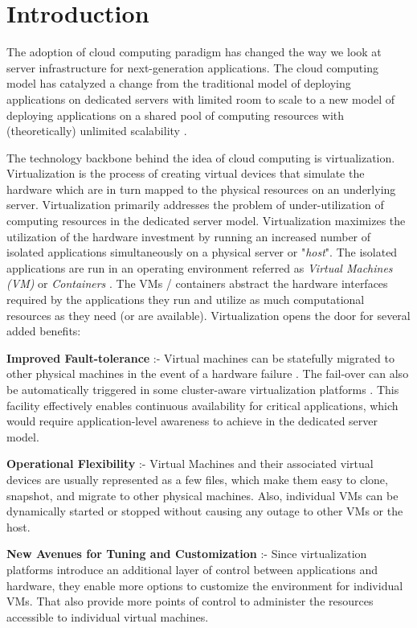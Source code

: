 \chapter{Introduction}


The adoption of cloud computing paradigm has changed the way we look at server infrastructure for next-generation applications. The cloud computing model has catalyzed a change from the traditional model of deploying applications on dedicated servers with limited room to scale to a new model of deploying applications on a shared pool of computing resources with (theoretically) unlimited scalability \cite{unlimited_scale}.  

The technology backbone behind the idea of cloud computing is virtualization. Virtualization is the process of creating virtual devices that simulate the hardware which are in turn mapped to the physical resources on an underlying server. Virtualization primarily addresses the problem of under-utilization of computing resources in the dedicated server model. Virtualization maximizes the utilization of the hardware investment by running an increased number of isolated applications simultaneously on a physical server or "\textit{host}". The isolated applications are run in an operating environment referred as \textit{Virtual Machines (VM)} \cite{5346711} or \textit{Containers} \cite{lxc}. The VMs / containers abstract the hardware interfaces required by the applications they run and utilize as much computational resources as they need (or are available). Virtualization opens the door for several added benefits:

    \textbf{Improved Fault-tolerance} :-  Virtual machines can be statefully migrated to other physical machines in the event of a hardware failure \cite{live_migration}. The fail-over can also be automatically triggered in some cluster-aware virtualization platforms  \cite{auto_vm_migration}. This facility effectively enables continuous availability for critical applications, which would require application-level awareness to achieve in the dedicated server model.

    \textbf{Operational Flexibility} :- Virtual Machines and their associated virtual devices are usually represented as a few files, which make them easy to clone, snapshot, and migrate to other physical machines. Also, individual VMs can be dynamically started or stopped without causing any outage to other VMs or the host.    

    \textbf{New Avenues for Tuning and Customization} :-  Since virtualization platforms introduce an additional layer of control between applications and hardware, they enable more options to customize the environment for individual VMs. That also provide more points of control to administer the resources accessible to individual virtual machines.

